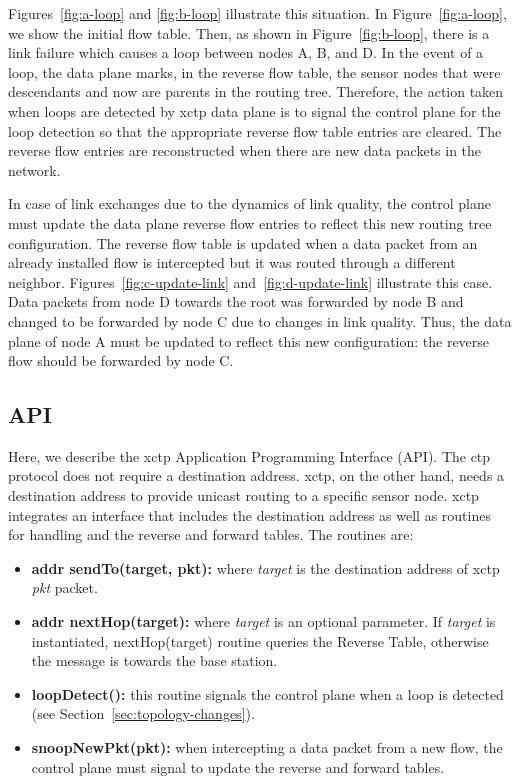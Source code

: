Figures~\ref{fig:a-loop} and \ref{fig:b-loop} illustrate this
situation. In Figure~\ref{fig:a-loop}, we show the initial flow
table. Then, as shown in Figure~\ref{fig:b-loop}, there is a link
failure which causes a loop between nodes A, B, and D. In the event
of a loop, the data plane marks, in the reverse flow table, the
sensor nodes that were descendants and now are parents in the
routing tree. Therefore, the action taken when loops are detected by
\ac{xctp} data plane is to signal the control plane for the loop
detection so that the appropriate reverse flow table entries are
cleared. The reverse flow entries are reconstructed when there are
new data packets in the network.


In case of link exchanges due to the dynamics of link quality, the
control plane must update the data plane reverse flow entries to
reflect this new routing tree configuration. The reverse flow table
is updated when a data packet from an already installed flow is
intercepted but it was routed through a different neighbor.
Figures~\ref{fig:c-update-link} and~\ref{fig:d-update-link}
illustrate this case. Data packets from node D towards the root was
forwarded by node B and changed to be forwarded by node C due to
changes in link quality. Thus, the data plane of node A must be
updated to reflect this new configuration: the reverse flow should
be forwarded by node C.


\subsection{API}
\label{sec:api}

Here, we describe the \ac{xctp} Application Programming Interface
(API). The \ac{ctp} protocol does not require a destination address.
\ac{xctp}, on the other hand, needs a destination address to provide
unicast routing to a specific sensor node. \ac{xctp} integrates an
interface that includes the destination address as well as routines
for handling and the reverse and forward tables. The routines are:

\begin{itemize}
    \item \textbf{addr sendTo(target, pkt):} where \textit{target} is the destination address of \ac{xctp} \textit{pkt} packet.
    \item \textbf{addr nextHop(target):} where \textit{target} is an optional parameter. If \textit{target} is instantiated, nextHop(target) routine queries the Reverse Table, otherwise the message is towards the base station.
     \item \textbf{loopDetect():} this routine signals the control plane when a loop is detected (see Section~\ref{sec:topology-changes}).
     \item \textbf{snoopNewPkt(pkt):} when intercepting a data packet from a new flow, the control plane must signal to update the reverse and forward tables.
\end{itemize}


